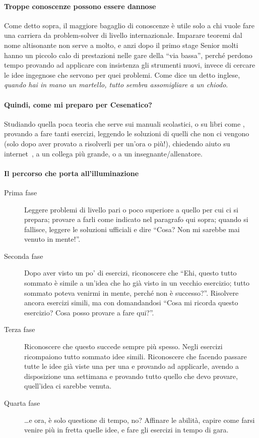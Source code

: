 \documentclass[a4paper,10pt]{paper}
\begin{document}
\paragraph{Troppe conoscenze possono essere dannose}
Come detto sopra, il maggiore bagaglio di conoscenze è utile solo a chi vuole fare una carriera da problem-solver di livello internazionale. Imparare teoremi dal nome altisonante non serve a molto, e anzi dopo il primo stage Senior molti hanno un piccolo calo di prestazioni nelle gare della ``via bassa'', perché perdono tempo provando ad applicare con insistenza gli strumenti nuovi, invece di cercare le idee ingegnose che servono per quei problemi. Come dice un detto inglese, \emph{quando hai in mano un martello, tutto sembra assomigliare a un chiodo}.

\paragraph{Quindi, come mi preparo per Cesenatico?}
Studiando quella poca teoria che serve sui manuali scolastici, o su libri come \cite{culipiccoli,dispenseudine,paolini}, provando a fare tanti esercizi, leggendo le soluzioni di quelli che non ci vengono (solo dopo aver provato a risolverli per un'ora o più!), chiedendo aiuto su internet~\cite{oliforum}, a un collega più grande, o a un insegnante/allenatore.
 
 \paragraph{Il percorso che porta all'illuminazione}
 \begin{description}
  \item[Prima fase] Leggere problemi di livello pari o poco superiore a quello per cui ci si prepara; provare a farli come indicato nel paragrafo qui sopra; quando si fallisce, leggere le soluzioni ufficiali e dire ``Cosa? Non mi sarebbe mai venuto in mente!''.
  \item[Seconda fase] Dopo aver visto un po' di esercizi, riconoscere che ``Ehi, questo tutto sommato è simile a un'idea che ho già visto in un vecchio esercizio; tutto sommato poteva venirmi in mente, perché non è successo?''. Risolvere ancora esercizi simili, ma con domandandosi ``Cosa mi ricorda questo esercizio? Cosa posso provare a fare qui?''.
  \item[Terza fase] Riconoscere che questo succede sempre più spesso. Negli esercizi ricompaiono tutto sommato idee simili. Riconoscere che facendo passare tutte le idee già viste una per una e provando ad applicarle, avendo a disposizione una settimana e provando tutto quello che devo provare, quell'idea ci sarebbe venuta.
  \item[Quarta fase] \dots{}e ora, è solo questione di tempo, no? Affinare le abilità, capire come farsi venire più in fretta quelle idee, e fare gli esercizi in tempo di gara.
 \end{description} 
 
\end{document}
